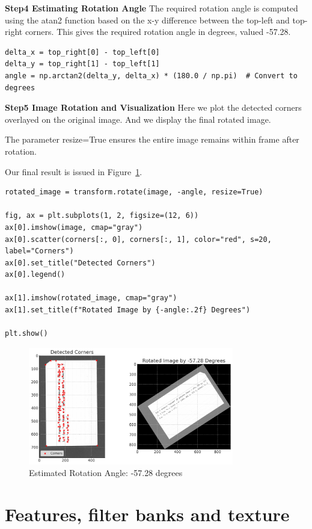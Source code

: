 \documentclass[12pt]{article}
\begin{document}
\textbf{Step4 Estimating Rotation Angle}
The required rotation angle is computed using the atan2 function based on the x-y difference between the top-left and top-right corners. This gives the required rotation angle in degrees, valued -57.28.

\begin{lstlisting}
delta_x = top_right[0] - top_left[0]
delta_y = top_right[1] - top_left[1]
angle = np.arctan2(delta_y, delta_x) * (180.0 / np.pi)  # Convert to degrees
\end{lstlisting}

\textbf{Step5 Image Rotation and Visualization}
Here we plot the detected corners overlayed on the original image. And we display the final rotated image.

The parameter resize=True ensures the entire image remains within frame after rotation. 

Our final result is issued in Figure~\ref{rot}.
\begin{lstlisting}
rotated_image = transform.rotate(image, -angle, resize=True)

fig, ax = plt.subplots(1, 2, figsize=(12, 6))
ax[0].imshow(image, cmap="gray")
ax[0].scatter(corners[:, 0], corners[:, 1], color="red", s=20, label="Corners")
ax[0].set_title("Detected Corners")
ax[0].legend()

ax[1].imshow(rotated_image, cmap="gray")
ax[1].set_title(f"Rotated Image by {-angle:.2f} Degrees")

plt.show()
\end{lstlisting}





\begin{figure}[h]
    \centering
    \includegraphics[width=0.8\textwidth]{pics/a6-2.1.png} 
    \caption{Estimated Rotation Angle: -57.28 degrees}
    \label{rot}
\end{figure}


\section{Features, filter banks and texture}
\end{document}
